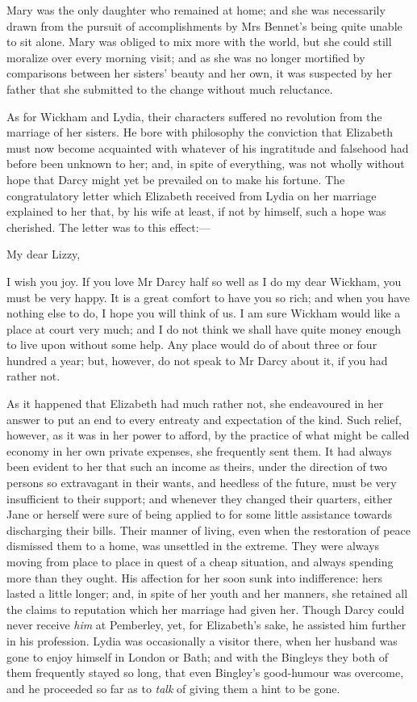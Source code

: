 Mary was the only daughter who remained at home; and she was necessarily drawn from the pursuit of accomplishments by Mrs Bennet's being quite unable to sit alone. Mary was obliged to mix more with the world, but she could still moralize over every morning visit; and as she was no longer mortified by comparisons between her sisters' beauty and her own, it was suspected by her father that she submitted to the change without much reluctance.

As for Wickham and Lydia, their characters suffered no revolution from the marriage of her sisters. He bore with philosophy the conviction that Elizabeth must now become acquainted with whatever of his ingratitude and falsehood had before been unknown to her; and, in spite of everything, was not wholly without hope that Darcy might yet be prevailed on to make his fortune. The congratulatory letter which Elizabeth received from Lydia on her marriage explained to her that, by his wife at least, if not by himself, such a hope was cherished. The letter was to this effect:—

\begin{mail}{}{My dear Lizzy,}

I wish you joy. If you love Mr Darcy half so well as I do my dear Wickham, you must be very happy. It is a great comfort to have you so rich; and when you have nothing else to do, I hope you will think of us. I am sure Wickham would like a place at court very much; and I do not think we shall have quite money enough to live upon without some help. Any place would do of about three or four hundred a year; but, however, do not speak to Mr Darcy about it, if you had rather not.
\end{mail}

As it happened that Elizabeth had much rather not, she endeavoured in her answer to put an end to every entreaty and expectation of the kind. Such relief, however, as it was in her power to afford, by the practice of what might be called economy in her own private expenses, she frequently sent them. It had always been evident to her that such an income as theirs, under the direction of two persons so extravagant in their wants, and heedless of the future, must be very insufficient to their support; and whenever they changed their quarters, either Jane or herself were sure of being applied to for some little assistance towards discharging their bills. Their manner of living, even when the restoration of peace dismissed them to a home, was unsettled in the extreme. They were always moving from place to place in quest of a cheap situation, and always spending more than they ought. His affection for her soon sunk into indifference: hers lasted a little longer; and, in spite of her youth and her manners, she retained all the claims to reputation which her marriage had given her. Though Darcy could never receive \textit{him} at Pemberley, yet, for Elizabeth's sake, he assisted him further in his profession. Lydia was occasionally a visitor there, when her husband was gone to enjoy himself in London or Bath; and with the Bingleys they both of them frequently stayed so long, that even Bingley's good-humour was overcome, and he proceeded so far as to \textit{talk} of giving them a hint to be gone.

